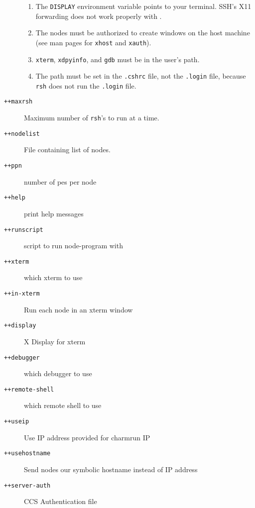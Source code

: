 \begin{description}
\begin{enumerate}
\item The {\tt DISPLAY} environment variable points to your terminal.
SSH's X11 forwarding does not work properly with \charmpp{}.

\item The nodes must be authorized to create windows on the host machine (see
man pages for {\tt xhost} and {\tt xauth}).

\item {\tt xterm}, {\tt xdpyinfo},  and {\tt gdb} must be in
the user's path.

\item The path must be set in the {\tt .cshrc} file, not the {\tt .login}
file, because {\tt rsh} does not run the {\tt .login} file. 

\end{enumerate}

\item[{\tt ++maxrsh}] Maximum number of {\tt rsh}'s to run at a
time.

\item[{\tt ++nodelist}] File containing list of nodes.


\item[{\tt ++ppn}]              number of pes per node

\item[{\tt ++help}]             print help messages

\item[{\tt ++runscript}]        script to run node-program with

\item[{\tt ++xterm}]            which xterm to use

\item[{\tt ++in-xterm}]         Run each node in an xterm window

\item[{\tt ++display}]          X Display for xterm

\item[{\tt ++debugger}]         which debugger to use

\item[{\tt ++remote-shell}]     which remote shell to use

\item[{\tt ++useip}]            Use IP address provided for charmrun IP

\item[{\tt ++usehostname}]      Send nodes our symbolic hostname instead of IP address

\item[{\tt ++server-auth}]      CCS Authentication file


\end{description}

